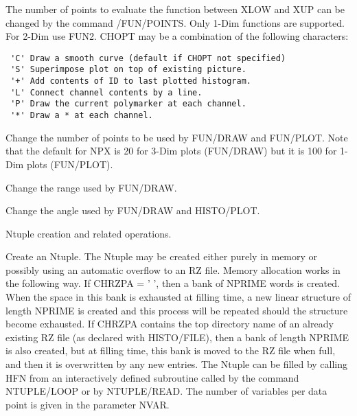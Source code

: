 The number of points to evaluate the function between XLOW and XUP
can be changed by the command /FUN/POINTS. Only 1-Dim functions
are supported. For 2-Dim use FUN2.
CHOPT may be a combination of the following characters:
\begin{verbatim}
 'C' Draw a smooth curve (default if CHOPT not specified)
 'S' Superimpose plot on top of existing picture.
 '+' Add contents of ID to last plotted histogram.
 'L' Connect channel contents by a line.
 'P' Draw the current polymarker at each channel.
 '*' Draw a * at each channel.
\end{verbatim}
\ENDTEXT

\BEGARG
{}
\ENDARG
\BEGTEXT
Change the number of points to be used by FUN/DRAW
and FUN/PLOT. Note that the default for NPX is 20 for 3-Dim plots
(FUN/DRAW) but it is 100 for 1-Dim plots (FUN/PLOT).
\ENDTEXT

\BEGARG
{}
\ENDARG
\BEGTEXT
Change the range used by FUN/DRAW.
\ENDTEXT

\BEGARG
{}
\ENDARG
\BEGTEXT
Change the angle used by FUN/DRAW and HISTO/PLOT.
\ENDTEXT


\BEGTEXT
Ntuple creation and related operations.
\ENDTEXT

\BEGARG
{}
\ENDARG
\BEGTEXT
Create an Ntuple.
The Ntuple may be created either purely in memory or possibly
using an automatic overflow to an RZ file.
Memory allocation works in the following way.
If CHRZPA = '  ', then a bank of NPRIME
words is created. When the space in this bank is exhausted at filling time,
a new linear structure of length NPRIME is created and this process will be
repeated should the structure become exhausted.
If CHRZPA contains the top directory name of an already existing RZ file (as
declared with HISTO/FILE), then a bank of length NPRIME is also created,
but at filling time, this bank is moved to the RZ file when full, and
then it is overwritten by any new entries.
The Ntuple can be filled by calling HFN from an interactively
defined subroutine called by the command NTUPLE/LOOP or by NTUPLE/READ.
The number of variables per data point is given in the parameter NVAR.
\ENDTEXT

